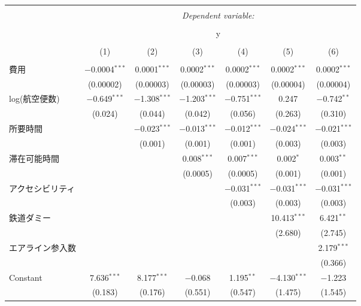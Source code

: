 \documentclass{jsarticle}
\begin{document}
\begin{table}[!htbp] \centering 
  \caption{} 
  \label{} 
\begin{tabular}{@{\extracolsep{5pt}}lcccccc} 
\\[-1.8ex]\hline 
\hline \\[-1.8ex] 
 & \multicolumn{6}{c}{\textit{Dependent variable:}} \\ 
\cline{2-7} 
\\[-1.8ex] & \multicolumn{6}{c}{y} \\ 
\\[-1.8ex] & (1) & (2) & (3) & (4) & (5) & (6)\\ 
\hline \\[-1.8ex] 
 費用 & $-$0.0004$^{***}$ & 0.0001$^{***}$ & 0.0002$^{***}$ & 0.0002$^{***}$ & 0.0002$^{***}$ & 0.0002$^{***}$ \\ 
  & (0.00002) & (0.00003) & (0.00003) & (0.00003) & (0.00004) & (0.00004) \\ 
  log(航空便数) & $-$0.649$^{***}$ & $-$1.308$^{***}$ & $-$1.203$^{***}$ & $-$0.751$^{***}$ & 0.247 & $-$0.742$^{**}$ \\ 
  & (0.024) & (0.044) & (0.042) & (0.056) & (0.263) & (0.310) \\ 
  所要時間 &  & $-$0.023$^{***}$ & $-$0.013$^{***}$ & $-$0.012$^{***}$ & $-$0.024$^{***}$ & $-$0.021$^{***}$ \\ 
  &  & (0.001) & (0.001) & (0.001) & (0.003) & (0.003) \\ 
  滞在可能時間 &  &  & 0.008$^{***}$ & 0.007$^{***}$ & 0.002$^{*}$ & 0.003$^{**}$ \\ 
  &  &  & (0.0005) & (0.0005) & (0.001) & (0.001) \\ 
  アクセシビリティ &  &  &  & $-$0.031$^{***}$ & $-$0.031$^{***}$ & $-$0.031$^{***}$ \\ 
  &  &  &  & (0.003) & (0.003) & (0.003) \\ 
  鉄道ダミー &  &  &  &  & 10.413$^{***}$ & 6.421$^{**}$ \\ 
  &  &  &  &  & (2.680) & (2.745) \\ 
  エアライン参入数 &  &  &  &  &  & 2.179$^{***}$ \\ 
  &  &  &  &  &  & (0.366) \\ 
  Constant & 7.636$^{***}$ & 8.177$^{***}$ & $-$0.068 & 1.195$^{**}$ & $-$4.130$^{***}$ & $-$1.223 \\ 
  & (0.183) & (0.176) & (0.551) & (0.547) & (1.475) & (1.545) \\ 

\end{tabular}
\end{table}
\end{document}
